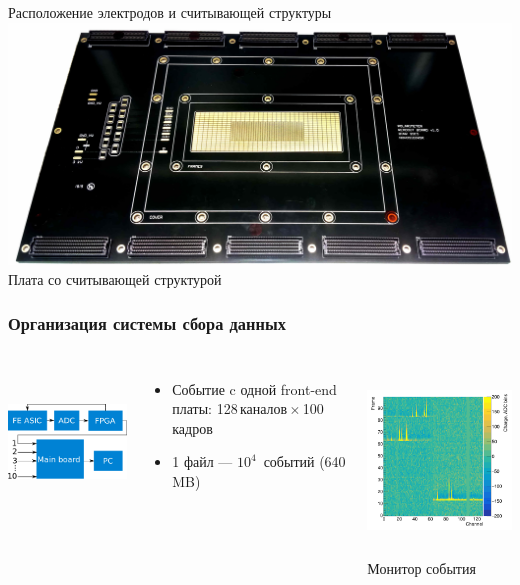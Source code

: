 \documentclass[14pt]{beamer}
\begin{document}
\begin{frame}[t]
\begin{minipage}[t]{0.39\linewidth}
		\tiny{Расположение электродов и считывающей структуры}
		\includegraphics[width=1\linewidth]{Main_board.jpg} 
		\newline \centering\tiny{Плата со считывающей структурой}
		\end{minipage}	
\end{frame}
\begin{frame}[t]

\frametitle{Организация системы сбора данных }
\begin{columns}
	\begin{minipage}[t][1\textheight]{\linewidth}
		\centering \includegraphics[width=6.6cm, height = 4cm]{DAQ.pdf}
		\small{\begin{itemize}
				\item Событие c одной front-end платы: 128\,каналов\,$\times$\,100\,кадров 
				\item 1 файл --- $10^4$~событий (640 MB)
		\end{itemize}}
	\end{minipage}%
	\begin{minipage}[t][1\textheight]{\linewidth}
		\vspace{20pt}
		\centering \includegraphics[width=5cm, height = 5cm]{Signal.png}
		\centering \tiny{Монитор события}
		
	\end{minipage}%
\end{columns}\end{frame}
\end{document}
